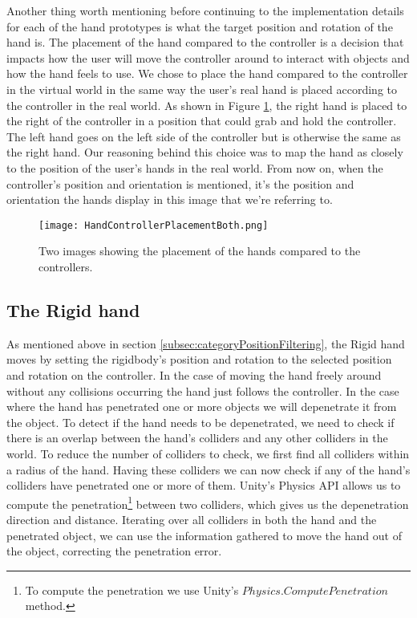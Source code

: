 Another thing worth mentioning before continuing to the implementation details for each of the hand prototypes is what the target position and rotation of the hand is. The placement of the hand compared to the controller is a decision that impacts how the user will move the controller around to interact with objects and how the hand feels to use. We chose to place the hand compared to the controller in the virtual world in the same way the user's real hand is placed according to the controller in the real world. As shown in Figure \ref{fig:handControllerPlacement}, the right hand is placed to the right of the controller in a position that could grab and hold the controller. The left hand goes on the left side of the controller but is otherwise the same as the right hand. Our reasoning behind this choice was to map the hand as closely to the position of the user's hands in the real world. From now on, when the controller's position and orientation is mentioned, it's the position and orientation the hands display in this image that we're referring to.

\begin{figure}[h]
\centering
\texttt{[image: HandControllerPlacementBoth.png]}
\caption{Two images showing the placement of the hands compared to the controllers.}
\label{fig:handControllerPlacement}
\end{figure}

\subsection{The Rigid hand}
\label{subsec:rigidHand}
As mentioned above in section \ref{subsec:categoryPositionFiltering}, the Rigid hand moves by setting the rigidbody's position and rotation to the selected position and rotation on the controller. In the case of moving the hand freely around without any collisions occurring the hand just follows the controller. In the case where the hand has penetrated one or more objects we will depenetrate it from the object. To detect if the hand needs to be depenetrated, we need to check if there is an overlap between the hand's colliders and any other colliders in the world. To reduce the number of colliders to check, we first find all colliders within a radius of the hand. Having these colliders we can now check if any of the hand's colliders have penetrated one or more of them. Unity's Physics API allows us to compute the penetration\footnote{To compute the penetration we use Unity's $Physics.ComputePenetration$ method.} between two colliders, which gives us the depenetration direction and distance. Iterating over all colliders in both the hand and the penetrated object, we can use the information gathered to move the hand out of the object, correcting the penetration error.

